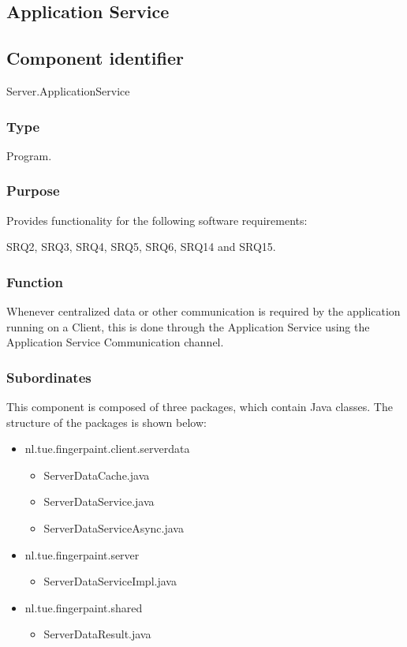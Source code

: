 \subsection{Application Service}
\label{subsec:appservice}

\subsection*{Component identifier}
Server.ApplicationService

\subsubsection*{Type}
Program.

\subsubsection*{Purpose}
Provides functionality for the following software requirements:

\noindent SRQ2, SRQ3, SRQ4, SRQ5, SRQ6, SRQ14 and SRQ15.

\subsubsection*{Function}
Whenever centralized data or other communication is required by the application running on a Client, this is done through the Application Service using the Application Service Communication channel.

\subsubsection*{Subordinates}
This component is composed of three packages, which contain Java classes. The structure of the packages is shown below:
\begin{itemize}
\item nl.tue.fingerpaint.client.serverdata
\begin{itemize}
\item ServerDataCache.java
\item ServerDataService.java
\item ServerDataServiceAsync.java
\end{itemize}
\item nl.tue.fingerpaint.server
\begin{itemize}
\item ServerDataServiceImpl.java
\end{itemize}
\item nl.tue.fingerpaint.shared
\begin{itemize}
\item ServerDataResult.java
\end{itemize}
\end{itemize}

